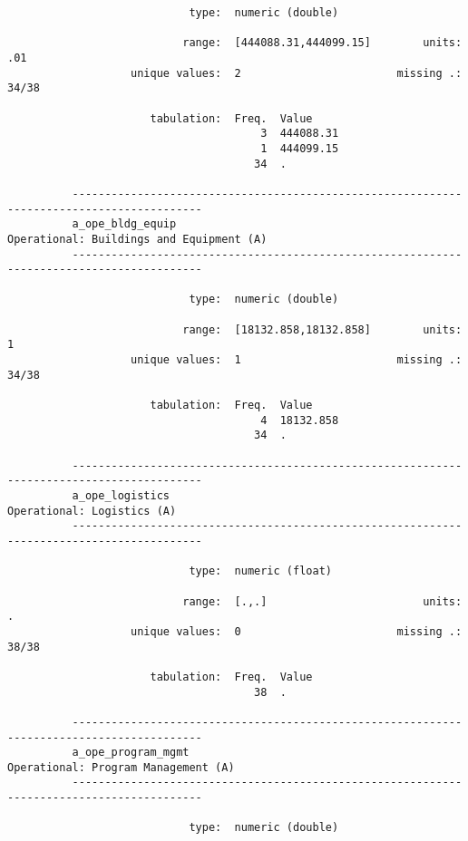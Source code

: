 \documentclass{article}
\begin{document}
\begin{verbatim}
                            type:  numeric (double)
          
                           range:  [444088.31,444099.15]        units:  .01
                   unique values:  2                        missing .:  34/38
          
                      tabulation:  Freq.  Value
                                       3  444088.31
                                       1  444099.15
                                      34  .
          
          ------------------------------------------------------------------------------------------
          a_ope_bldg_equip                                  Operational: Buildings and Equipment (A)
          ------------------------------------------------------------------------------------------
          
                            type:  numeric (double)
          
                           range:  [18132.858,18132.858]        units:  1
                   unique values:  1                        missing .:  34/38
          
                      tabulation:  Freq.  Value
                                       4  18132.858
                                      34  .
          
          ------------------------------------------------------------------------------------------
          a_ope_logistics                                                 Operational: Logistics (A)
          ------------------------------------------------------------------------------------------
          
                            type:  numeric (float)
          
                           range:  [.,.]                        units:  .
                   unique values:  0                        missing .:  38/38
          
                      tabulation:  Freq.  Value
                                      38  .
          
          ------------------------------------------------------------------------------------------
          a_ope_program_mgmt                                     Operational: Program Management (A)
          ------------------------------------------------------------------------------------------
          
                            type:  numeric (double)
          

\end{verbatim}
\end{document}
